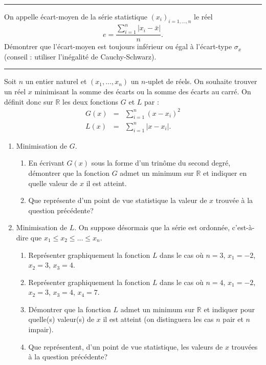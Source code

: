 \documentclass[../PolyS4.tex]{subfiles}
\begin{document}
\vspace{1em}
\hrule
\vspace{1em}


On appelle écart-moyen de la série statistique $(x_i)_{i=1,\dots,n}$ le réel 
$$e=\frac {\sum_{i=1}^n |x_i-\bar x|}n.$$
Démontrer que l'écart-moyen est toujours inférieur ou égal à l'écart-type $\sigma_x$ (conseil : utiliser l'inégalité de Cauchy-Schwarz).

\vspace{1em}
\hrule
\vspace{1em}


Soit $n$ un entier naturel et $(x_1,\dots,x_n)$ un $n$-uplet de réels. On souhaite trouver un réel $x$ minimisant la somme des écarts ou la somme des écarts au carré. On définit donc sur $\mathbb R$ les deux fonctions $G$ et $L$ par :
\begin{eqnarray*}
G(x)&=&\sum_{i=1}^n (x-x_i)^2\\
L(x)&=&\sum_{i=1}^n |x-x_i|.
\end{eqnarray*}

\begin{enumerate}
\item Minimisation de $G$.
\begin{enumerate}
\item En écrivant $G(x)$ sous la forme d'un trinôme du second degré, démontrer que la fonction $G$ admet un minimum sur $\mathbb R$ et indiquer en quelle valeur de $x$ il est atteint.
\item Que représente d'un point de vue statistique la valeur de $x$ trouvée à la question précédente?
\end{enumerate}
\item Minimisation de $L$. On suppose désormais que la série est ordonnée, c'est-à-dire que $x_1\leq  x_2\leq  \dots\leq  x_n$.
 \begin{enumerate}
\item Représenter graphiquement la fonction $L$ dans le cas où $n=3$, $x_1=-2$, $x_2=3$, $x_3=4$.
\item Représenter graphiquement la fonction $L$ dans le cas où $n=4$, $x_1=-2$, $x_2=3$, $x_3=4$, $x_4=7$.
\item Démontrer que la fonction $L$ admet un minimum sur $\mathbb R$ et indiquer pour quelle(s) valeur(s) de $x$ il est atteint
(on distinguera les cas $n$ pair et $n$ impair).
\item Que représentent, d'un point de vue statistique, les valeurs de $x$ trouvées à la question précédente?
\end{enumerate}
\end{enumerate}
\end{document}
